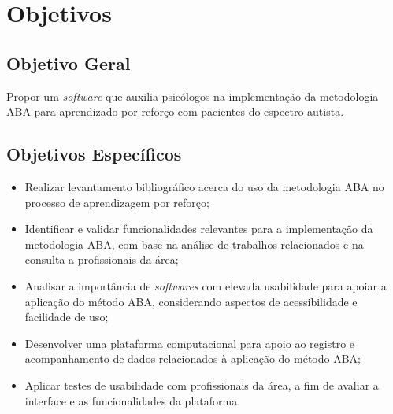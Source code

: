 \section{Objetivos}
    \subsection{Objetivo Geral}
    Propor um \textit{software} que auxilia psicólogos na implementação da metodologia ABA para 
    aprendizado por reforço com pacientes do espectro autista.

\subsection{Objetivos Específicos}
\begin{itemize}
    \item Realizar levantamento bibliográfico acerca do uso da metodologia ABA no processo de 
    aprendizagem por reforço;

    \item Identificar e validar funcionalidades relevantes para a implementação da metodologia ABA, 
    com base na análise de trabalhos relacionados e na consulta a profissionais da área;

    \item Analisar a importância de \textit{softwares} com elevada usabilidade para apoiar a aplicação 
    do método ABA, considerando aspectos de acessibilidade e facilidade de uso;

    \item Desenvolver uma plataforma computacional para apoio ao registro e acompanhamento de dados 
    relacionados à aplicação do método ABA;

    \item Aplicar testes de usabilidade com profissionais da área, a fim de avaliar a interface e 
    as funcionalidades da plataforma.
\end{itemize}


